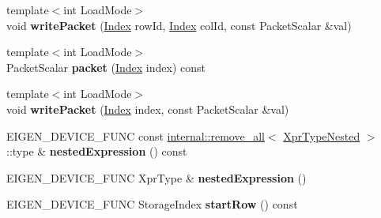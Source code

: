 \begin{DoxyCompactItemize}
\item 
\mbox{\label{class_eigen_1_1internal_1_1_block_impl__dense_aaeffe51db30fa700fb40e46727dc24db}} 
{\footnotesize template$<$int Load\+Mode$>$ }\\void {\bfseries write\+Packet} (\hyperlink{namespace_eigen_a62e77e0933482dafde8fe197d9a2cfde}{Index} row\+Id, \hyperlink{namespace_eigen_a62e77e0933482dafde8fe197d9a2cfde}{Index} col\+Id, const Packet\+Scalar \&val)
\item 
\mbox{\label{class_eigen_1_1internal_1_1_block_impl__dense_a56988e0d84a8bd0bc238a90dda7fb101}} 
{\footnotesize template$<$int Load\+Mode$>$ }\\Packet\+Scalar {\bfseries packet} (\hyperlink{namespace_eigen_a62e77e0933482dafde8fe197d9a2cfde}{Index} index) const
\item 
\mbox{\label{class_eigen_1_1internal_1_1_block_impl__dense_a1529a7640b9ee5fa3508366ea5e768c2}} 
{\footnotesize template$<$int Load\+Mode$>$ }\\void {\bfseries write\+Packet} (\hyperlink{namespace_eigen_a62e77e0933482dafde8fe197d9a2cfde}{Index} index, const Packet\+Scalar \&val)
\item 
\mbox{\label{class_eigen_1_1internal_1_1_block_impl__dense_a0787c7ed9ab44398bda9ce26f4ed2917}} 
E\+I\+G\+E\+N\+\_\+\+D\+E\+V\+I\+C\+E\+\_\+\+F\+U\+NC const \hyperlink{struct_eigen_1_1internal_1_1remove__all}{internal\+::remove\+\_\+all}$<$ \hyperlink{class_eigen_1_1internal_1_1_tensor_lazy_evaluator_writable}{Xpr\+Type\+Nested} $>$\+::type \& {\bfseries nested\+Expression} () const
\item 
\mbox{\label{class_eigen_1_1internal_1_1_block_impl__dense_a286c3b51a17651242aea9c6ae44991d5}} 
E\+I\+G\+E\+N\+\_\+\+D\+E\+V\+I\+C\+E\+\_\+\+F\+U\+NC Xpr\+Type \& {\bfseries nested\+Expression} ()
\item 
\mbox{\label{class_eigen_1_1internal_1_1_block_impl__dense_a66b5ab9ca60354d0ccf089b45845fc35}} 
E\+I\+G\+E\+N\+\_\+\+D\+E\+V\+I\+C\+E\+\_\+\+F\+U\+NC Storage\+Index {\bfseries start\+Row} () const

\end{DoxyCompactItemize}
